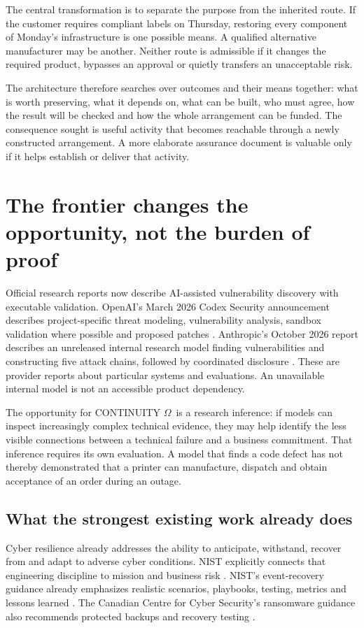 \documentclass[11pt,a4paper]{article}
\newcommand{\om}{CONTINUITY $\Omega$}
\begin{document}
The central transformation is to separate the purpose from the inherited route. If the customer requires compliant labels on Thursday, restoring every component of Monday's infrastructure is one possible means. A qualified alternative manufacturer may be another. Neither route is admissible if it changes the required product, bypasses an approval or quietly transfers an unacceptable risk.

The architecture therefore searches over outcomes and their means together: what is worth preserving, what it depends on, what can be built, who must agree, how the result will be checked and how the whole arrangement can be funded. The consequence sought is useful activity that becomes reachable through a newly constructed arrangement. A more elaborate assurance document is valuable only if it helps establish or deliver that activity.

\section{The frontier changes the opportunity, not the burden of proof}\label{sec:frontier}
Official research reports now describe AI-assisted vulnerability discovery with executable validation. OpenAI's March 2026 Codex Security announcement describes project-specific threat modeling, vulnerability analysis, sandbox validation where possible and proposed patches \cite{codexSecurity}. Anthropic's October 2026 report describes an unreleased internal research model finding vulnerabilities and constructing five attack chains, followed by coordinated disclosure \cite{anthropicCyber}. These are provider reports about particular systems and evaluations. An unavailable internal model is not an accessible product dependency.

The opportunity for \om\ is a research inference: if models can inspect increasingly complex technical evidence, they may help identify the less visible connections between a technical failure and a business commitment. That inference requires its own evaluation. A model that finds a code defect has not thereby demonstrated that a printer can manufacture, dispatch and obtain acceptance of an order during an outage.

\subsection{What the strongest existing work already does}
Cyber resilience already addresses the ability to anticipate, withstand, recover from and adapt to adverse cyber conditions. NIST explicitly connects that engineering discipline to mission and business risk \cite{nist160}. NIST's event-recovery guidance already emphasizes realistic scenarios, playbooks, testing, metrics and lessons learned \cite{nist184}. The Canadian Centre for Cyber Security's ransomware guidance also recommends protected backups and recovery testing \cite{canadaRansomware}.
\end{document}
